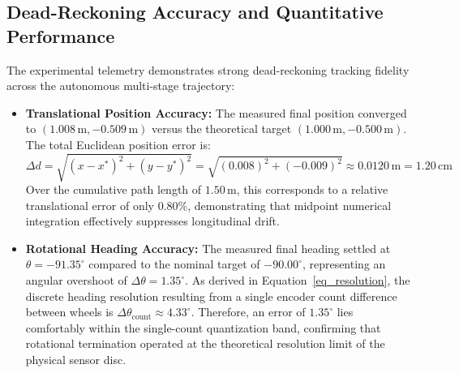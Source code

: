 \documentclass[11pt,a4paper]{article}
\begin{document}
\subsection{Dead-Reckoning Accuracy and Quantitative Performance}
The experimental telemetry demonstrates strong dead-reckoning tracking fidelity across the autonomous multi-stage trajectory:
\begin{itemize}[leftmargin=*,noitemsep,topsep=1pt]
    \item \textbf{Translational Position Accuracy:} The measured final position converged to $(1.008\,\text{m}, -0.509\,\text{m})$ versus the theoretical target $(1.000\,\text{m}, -0.500\,\text{m})$. The total Euclidean position error is:
    \begin{equation}
        \Delta d = \sqrt{(x - x^*)^2 + (y - y^*)^2} = \sqrt{(0.008)^2 + (-0.009)^2} \approx 0.0120\,\text{m} = 1.20\,\text{cm}
    \end{equation}
    Over the cumulative path length of $1.50\,\text{m}$, this corresponds to a relative translational error of only $0.80\%$, demonstrating that midpoint numerical integration effectively suppresses longitudinal drift.
    \item \textbf{Rotational Heading Accuracy:} The measured final heading settled at $\theta = -91.35^\circ$ compared to the nominal target of $-90.00^\circ$, representing an angular overshoot of $\Delta \theta = 1.35^\circ$. As derived in Equation~\ref{eq_resolution}, the discrete heading resolution resulting from a single encoder count difference between wheels is $\Delta \theta_{\text{count}} \approx 4.33^\circ$. Therefore, an error of $1.35^\circ$ lies comfortably within the single-count quantization band, confirming that rotational termination operated at the theoretical resolution limit of the physical sensor disc.
\end{itemize}

\newpage
\end{document}
